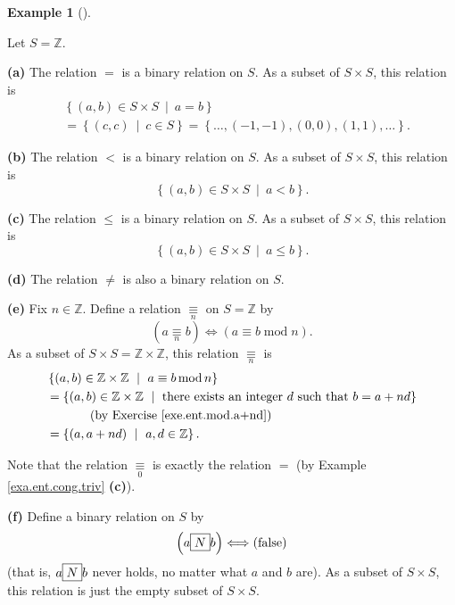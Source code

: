 \documentclass[numbers=enddot,12pt,final,onecolumn,notitlepage]{scrartcl}%
\numberwithin{exer}{subsection}
\theoremstyle{definition}
\newtheorem{exam}[theo]{Example}
\newenvironment{example}[1][]
{\begin{exam}[#1]\begin{leftbar}}
{\end{leftbar}\end{exam}}
\begin{document}
\begin{example}
\label{exa.eqrel.rel.rels1}Let $S=\mathbb{Z}$.

\textbf{(a)} The relation $=$ is a binary relation on $S$. As a subset of
$S\times S$, this relation is%
\begin{align*}
&  \left\{  \left(  a,b\right)  \in S\times S\ \mid\ a=b\right\} \\
&  =\left\{  \left(  c,c\right)  \ \mid\ c\in S\right\}  =\left\{
\ldots,\left(  -1,-1\right)  ,\left(  0,0\right)  ,\left(  1,1\right)
,\ldots\right\}  .
\end{align*}


\textbf{(b)} The relation $<$ is a binary relation on $S$. As a subset of
$S\times S$, this relation is%
\[
\left\{  \left(  a,b\right)  \in S\times S\ \mid\ a<b\right\}  .
\]


\textbf{(c)} The relation $\leq$ is a binary relation on $S$. As a subset of
$S\times S$, this relation is%
\[
\left\{  \left(  a,b\right)  \in S\times S\ \mid\ a\leq b\right\}  .
\]


\textbf{(d)} The relation $\neq$ is also a binary relation on $S$.

\textbf{(e)} Fix $n\in\mathbb{Z}$. Define a relation $\underset{n}{\equiv}$ on
$S=\mathbb{Z}$ by
\[
\left(  a\underset{n}{\equiv}b\right)  \Longleftrightarrow\left(  a\equiv
b\operatorname{mod}n\right)  .
\]
As a subset of $S\times S=\mathbb{Z}\times\mathbb{Z}$, this relation
$\underset{n}{\equiv}$ is%
\begin{align*}
&  \left\{  \left(  a,b\right)  \in\mathbb{Z}\times\mathbb{Z}\ \mid\ a\equiv
b\operatorname{mod}n\right\} \\
&  =\left\{  \left(  a,b\right)  \in\mathbb{Z}\times\mathbb{Z}\ \mid
\ \text{there exists an integer }d\text{ such that }b=a+nd\right\} \\
&  \ \ \ \ \ \ \ \ \ \ \left(  \text{by Exercise \ref{exe.ent.mod.a+nd}%
}\right) \\
&  =\left\{  \left(  a,a+nd\right)  \ \mid\ a,d\in\mathbb{Z}\right\}  .
\end{align*}


Note that the relation $\underset{0}{\equiv}$ is exactly the relation $=$ (by
Example \ref{exa.ent.cong.triv} \textbf{(c)}).

\textbf{(f)} Define a binary relation  on $S$ by%
\[
\left(  a\fbox{$N$}b\right)  \Longleftrightarrow\left(  \text{false}\right)
\]
(that is, $a\fbox{$N$}b$ never holds, no matter what $a$ and $b$ are). As a
subset of $S\times S$, this relation  is just the empty subset of
$S\times S$.


\end{example}
\end{document}
